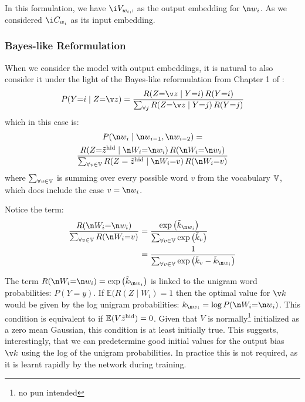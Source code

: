 {In this formulation, we have $\i V_{w_{i},:}$ as the output embedding for $\n w_{i}$.
As we considered  $\i C_{w_{i}}$ as its input embedding.


\subsubsection{Bayes-like Reformulation}
When we consider the model with output embeddings, 
it is natural to also consider it under the light of the Bayes-like reformulation from Chapter 1 of \citet{NRoNL}:
\begin{multline}
P(Y{=}i\mid Z{=}\v z)=\frac{R(Z{=}\v z\mid Y{=}i)\,R(Y{=}i)}{\sum_{\forall j}R(Z{=}\v z\mid Y{=}j)\,R(Y{=}j)}
\end{multline}
which in this case is:
\begin{multline}
P(\n w_{i}\mid \n w_{i-1},\n w_{i-2})=\\
\frac{R(Z{=}\dv z_{hid} \mid \n W_{i}{=} \n w_{i})\,R(\n W_{i}{=}\n w_{i})}{
	\sum_{\forall v \in \set V}R(Z=\dv z_{hid}\mid \n W_{i} {=} v)\,R(\n W_{i}{=}v)
}
\end{multline}
where $\sum_{\forall v \in \mathbb{V}}$ is summing over every possible word $v$ from the vocabulary $\mathbb{V}$,
which does include the case $v=\n w_i$.

Notice the term:
\begin{align}
\frac{R(\n W_{i}{=}\n w_{i})}{\sum_{\forall v \in \set V} R(\n W_{i}{=}v)} 
&= \frac{\exp{\iv k_{\n w_i}}}{\sum_{\forall v \in \set V} \exp{\iv k_{v}}}\\
&= \frac{1}{\sum_{\forall v \in \set V} \exp{\iv k_{v} - \iv k_{\n w_i}}}
\end{align}


The term $R(\n W_{i}{=}\n w_i)=\exp{\iv k_{\n w_i}}$ is linked to the unigram word probabilities: $P(Y=y)$.
If $\mathbb{E}(R(Z\mid W_{i})=1$ then the optimal value for $\v k$ would be given by the log unigram probabilities: $k_{\n w_i}=\log P(\n W_{i}{=} \n w_{i})$.
This condition is equivalent to if $\mathbb{E}(V\dv z_{hid})=0$.
Given that  $V$ is normally\footnote{no pun intended} initialized as a zero mean Gaussian, this condition is at least initially true.
This suggests, interestingly, that we can predetermine good initial values for the output bias $\v k$ using the log of the unigram probabilities.
In practice this is not required, as it is learnt rapidly by the network during training.


}
